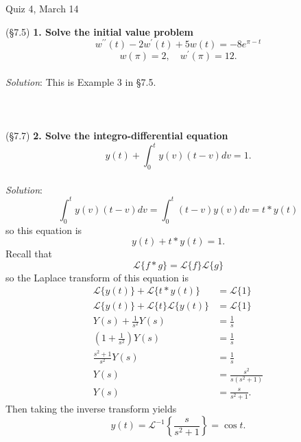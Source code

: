\documentclass[12pt]{article}
\newcommand{\Laplace}{\mathscr{L}}
\begin{document}
\begin{center}
{\Large Quiz 4, March 14}
\end{center}
(\S 7.5) \textbf{1. Solve the initial value problem}
$$w^{\prime\prime}(t) - 2w^\prime(t) + 5w(t) = -8e^{\pi-t}$$
$$w(\pi) = 2, \quad w^\prime(\pi) = 12.$$
~\\
\emph{Solution}:
This is Example 3 in \S 7.5. \\
~\\~\\~\\
(\S 7.7) \textbf{2. Solve the integro-differential equation}
$$y(t) + \int_0^t y(v) (t-v) dv = 1.$$
~\\
\emph{Solution}:
$$\int_0^t y(v) (t-v) dv = \int_0^t (t-v) y(v) dv = t \ast y(t)$$
so this equation is
$$y(t) + t \ast y(t) = 1.$$
Recall that
$$\Laplace \{f \ast g\} = \Laplace \{f\} \Laplace \{g\}$$
so the Laplace transform of this equation is
$$\begin{aligned}
\Laplace \{y(t)\} + \Laplace \{ t \ast y(t) \} &= \Laplace \{1 \} \\
\Laplace \{y(t)\} + \Laplace \{ t \} \Laplace \{ y(t) \} &= \Laplace \{1 \} \\
Y(s) + \frac{1}{s^2} Y(s) &= \frac{1}{s} \\
\left( 1 + \frac{1}{s^2} \right) Y(s) &= \frac{1}{s} \\
\frac{s^2 + 1}{s^2} Y(s) &= \frac{1}{s} \\
Y(s) &= \frac{s^2}{s(s^2+1)} \\
Y(s) &= \frac{s}{s^2+1}.
\end{aligned}$$
Then taking the inverse transform yields
$$y(t) = \Laplace^{-1} \left\{ \frac{s}{s^2+1} \right\} = \cos t.$$
\end{document}
